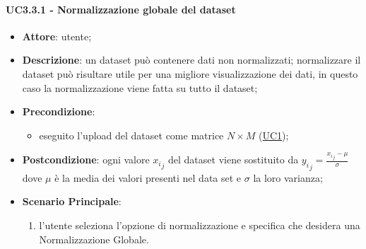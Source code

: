     \paragraph{UC3.3.1 - Normalizzazione globale del dataset}
    \label{uc5.2.1}
    \begin{itemize}
    \item \textbf{Attore}: utente;
    \item \textbf{Descrizione}: un dataset può contenere dati non normalizzati; normalizzare il dataset può risultare utile per una migliore visualizzazione dei dati, in questo caso la normalizzazione viene fatta su tutto il dataset;
    \item \textbf{Precondizione}: 
    \begin{itemize}
        \item eseguito l'upload del dataset come matrice $N\times M$ (\hyperref[uc1]{UC1});
    \end{itemize}  
    \item \textbf{Postcondizione}:  ogni valore ${x_i}_j$ del dataset viene sostituito da $ {y_i}_j = \frac{{x_i}_j - \mu}{\sigma}$ dove $\mu$ è la media dei valori presenti nel data set e $\sigma$ la loro varianza;
    \item \textbf{Scenario Principale}: 
    \begin{enumerate}
        \item l'utente seleziona l'opzione di normalizzazione e specifica che desidera una Normalizzazione Globale.
    \end{enumerate}  
    \end{itemize}
    
